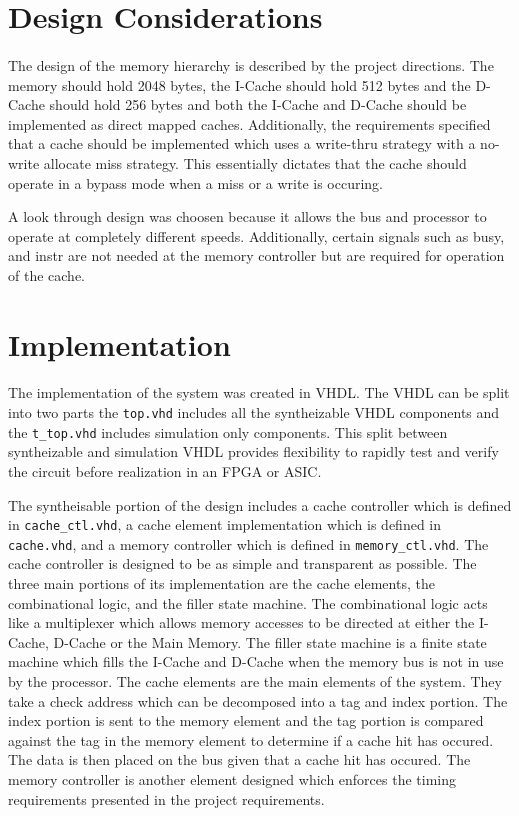 \documentclass[11pt,letterpaper,]{article}
\begin{document}
\section{ Design Considerations }
\paragraph{}
The design of the memory hierarchy is described by the project directions.  The memory should hold 2048 bytes, the I-Cache should hold 512 bytes and the D-Cache should hold 256 bytes and both the I-Cache and D-Cache should be implemented as direct mapped caches.  Additionally, the requirements specified that a cache should be implemented which uses a write-thru strategy with a no-write allocate miss strategy.  This essentially dictates that the cache should operate in a bypass mode when a miss or a write is occuring. 

A look through design was choosen because it allows the bus and processor to operate at completely different speeds.  Additionally, certain signals such as busy, and instr are not needed at the memory controller but are required for operation of the cache.  

\section{ Implementation }
\paragraph{}
The implementation of the system was created in VHDL.  The VHDL can be split into two parts the \verb|top.vhd| includes all the syntheizable VHDL components and the \verb|t_top.vhd| includes simulation only components.  This split between syntheizable and simulation VHDL provides flexibility to rapidly test and verify the circuit before realization in an FPGA or ASIC. 

The syntheisable portion of the design includes a cache controller which is defined in \verb|cache_ctl.vhd|, a cache element implementation which is defined in \verb|cache.vhd|, and a memory controller which is defined in \verb|memory_ctl.vhd|.  The cache controller is designed to be as simple and transparent as possible.  The three main portions of its implementation are the cache elements, the combinational logic, and the filler state machine.  The combinational logic acts like a multiplexer which allows memory accesses to be directed at either the I-Cache, D-Cache or the Main Memory.  The filler state machine is a finite state machine which fills the I-Cache and D-Cache when the memory bus is not in use by the processor.  The cache elements are the main elements of the system.  They take a check address which can be decomposed into a tag and index portion.  The index portion is sent to the memory element and the tag portion is compared against the tag in the memory element to determine if a cache hit has occured.  The data is then placed on the bus given that a cache hit has occured.  The memory controller is another element designed which enforces the timing requirements presented in the project requirements.  
\end{document}
